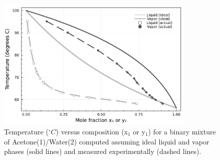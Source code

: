 \begin{figure}[h!]\centering
\captionsetup{width=0.85\linewidth}
\includegraphics[width=0.85\textwidth]{./figs/Fig-Txy-acetone-water-ideal-P101_325-kPa-AP2.pdf}
\caption{Temperature ($^{\circ}C$) versus composition (x$_{1}$ or y$_{1}$) for a binary mixture of Acetone(1)/Water(2) computed assuming ideal 
liquid and vapor phases (solid lines) and measured experimentally (dashed lines).}\label{fig-VLE-ideal-problem-Txy}
\end{figure}

